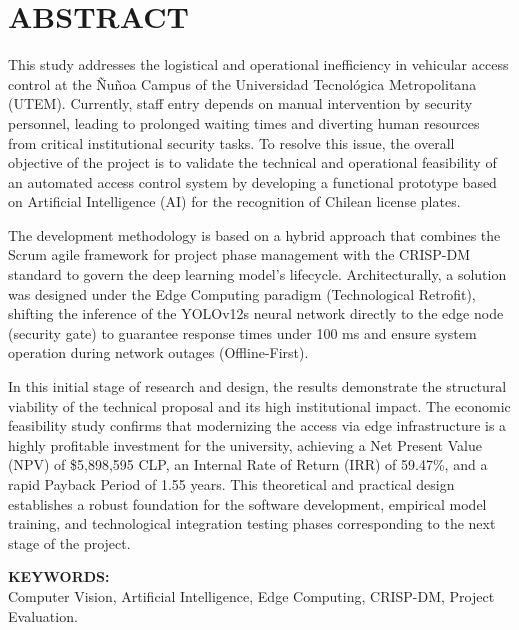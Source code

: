 
\chapter*{ABSTRACT}
\thispagestyle{fancy}

This study addresses the logistical and operational inefficiency in vehicular access control at the Ñuñoa Campus of the Universidad Tecnológica Metropolitana (UTEM). Currently, staff entry depends on manual intervention by security personnel, leading to prolonged waiting times and diverting human resources from critical institutional security tasks. To resolve this issue, the overall objective of the project is to validate the technical and operational feasibility of an automated access control system by developing a functional prototype based on Artificial Intelligence (AI) for the recognition of Chilean license plates.

The development methodology is based on a hybrid approach that combines the Scrum agile framework for project phase management with the CRISP-DM standard to govern the deep learning model's lifecycle. Architecturally, a solution was designed under the Edge Computing paradigm (Technological Retrofit), shifting the inference of the YOLOv12s neural network directly to the edge node (security gate) to guarantee response times under 100 ms and ensure system operation during network outages (Offline-First).

In this initial stage of research and design, the results demonstrate the structural viability of the technical proposal and its high institutional impact. The economic feasibility study confirms that modernizing the access via edge infrastructure is a highly profitable investment for the university, achieving a Net Present Value (NPV) of \$5,898,595 CLP, an Internal Rate of Return (IRR) of 59.47\%, and a rapid Payback Period of 1.55 years. This theoretical and practical design establishes a robust foundation for the software development, empirical model training, and technological integration testing phases corresponding to the next stage of the project.

\noindent\textbf{KEYWORDS:}\\
Computer Vision, Artificial Intelligence, Edge Computing, CRISP-DM, Project Evaluation.

\newpage
